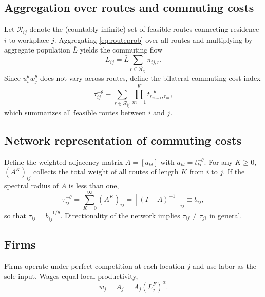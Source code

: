 \documentclass[12pt]{article}
\begin{document}
	\subsection{Aggregation over routes and commuting costs}
	Let $\mathcal R_{ij}$ denote the (countably infinite) set of feasible routes connecting residence $i$ to workplace $j$. Aggregating \eqref{eq:routeprob} over all routes and multiplying by aggregate population $\bar L$ yields the commuting flow
	\begin{equation}
		L_{ij}=\bar L \sum_{r\in\mathcal R_{ij}} \pi_{ij,r}.
		\label{eq:flowdef}
	\end{equation}
	Since $u_i^\theta w_j^\theta$ does not vary across routes, define the bilateral commuting cost index
	\begin{equation}
		\tau_{ij}^{-\theta}
		\equiv
		\sum_{r\in\mathcal R_{ij}}
		\prod_{m=1}^{K} t_{r_{m-1},r_m}^{-\theta},
		\label{eq:tau_def}
	\end{equation}
	which summarizes all feasible routes between $i$ and $j$.
	
	\subsection{Network representation of commuting costs}
	Define the weighted adjacency matrix $A=[a_{kl}]$ with $a_{kl}=t_{kl}^{-\theta}$. For any $K\ge0$, $(A^K)_{ij}$ collects the total weight of all routes of length $K$ from $i$ to $j$. If the spectral radius of $A$ is less than one,
	\begin{equation}
		\tau_{ij}^{-\theta}=\sum_{K=0}^{\infty}(A^K)_{ij}=[(I-A)^{-1}]_{ij}\equiv b_{ij},
		\label{eq:tau}
	\end{equation}
	so that $\tau_{ij}=b_{ij}^{-1/\theta}$. Directionality of the network implies $\tau_{ij}\neq\tau_{ji}$ in general.
	
	\subsection{Firms}
	Firms operate under perfect competition at each location $j$ and use labor as the sole input. Wages equal local productivity,
	\begin{equation}
		w_j=A_j=\bar A_j (L_j^F)^{\alpha}.
		\label{eq:wage}
	\end{equation}
	
\end{document}
